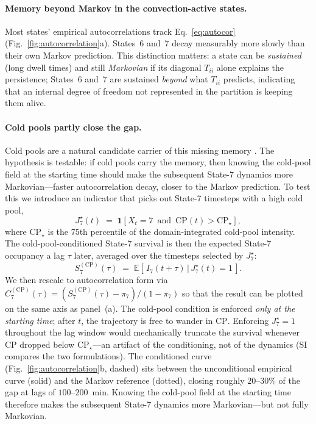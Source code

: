 \documentclass[11pt]{article}
\begin{document}
\paragraph{Memory beyond Markov in the convection-active states.}
Most states' empirical autocorrelations track Eq.~\ref{eq:autocor} (Fig.~\ref{fig:autocorrelation}a). States~6 and~7 decay measurably more slowly than their own Markov prediction. This distinction matters: a state can be \emph{sustained} (long dwell times) and still \emph{Markovian} if its diagonal $T_{ii}$ alone explains the persistence; States~6 and~7 are sustained \emph{beyond} what $T_{ii}$ predicts, indicating that an internal degree of freedom not represented in the partition is keeping them alive.

\paragraph{Cold pools partly close the gap.}
Cold pools are a natural candidate carrier of this missing memory \citep{tompkins2001coldpools, houze1977structure, rotunno1988theory}. The hypothesis is testable: if cold pools carry the memory, then knowing the cold-pool field at the starting time should make the subsequent State-7 dynamics more Markovian---faster autocorrelation decay, closer to the Markov prediction. To test this we introduce an indicator that picks out State-7 timesteps with a high cold pool,
\begin{equation}
J_7^\star(t) \;=\; \mathbf{1}\!\left[X_t = 7 \,\text{ and }\, \mathrm{CP}(t) > \mathrm{CP}_\star\right],
\end{equation}
where $\mathrm{CP}_\star$ is the 75th percentile of the domain-integrated cold-pool intensity. The cold-pool-conditioned State-7 survival is then the expected State-7 occupancy a lag $\tau$ later, averaged over the timesteps selected by $J_7^\star$:
\begin{equation}
S^{(\mathrm{CP})}_7(\tau) \;=\; \mathbb{E}\!\left[\,I_7(t+\tau) \,\big|\, J_7^\star(t) = 1\,\right].
\end{equation}
We then rescale to autocorrelation form via $C^{(\mathrm{CP})}_7(\tau) = (S^{(\mathrm{CP})}_7(\tau) - \pi_7)/(1-\pi_7)$ so that the result can be plotted on the same axis as panel~(a). The cold-pool condition is enforced \emph{only at the starting time}; after $t$, the trajectory is free to wander in $\mathrm{CP}$. Enforcing $J_7^\star = 1$ throughout the lag window would mechanically truncate the survival whenever $\mathrm{CP}$ dropped below $\mathrm{CP}_\star$---an artifact of the conditioning, not of the dynamics (SI compares the two formulations). The conditioned curve (Fig.~\ref{fig:autocorrelation}b, dashed) sits between the unconditional empirical curve (solid) and the Markov reference (dotted), closing roughly $20$--$30\%$ of the gap at lags of $100$--$200$~min. Knowing the cold-pool field at the starting time therefore makes the subsequent State-7 dynamics more Markovian---but not fully Markovian.
\end{document}
